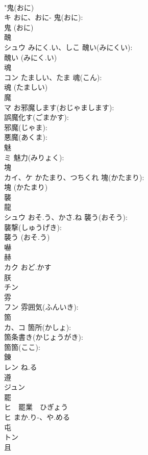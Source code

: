 \documentclass[8pt]{extreport}
\begin{document}
\begin{CJK}{UTF8}{min}
\\	"鬼(おに) 
\\	キ	おに、おに-	鬼(おに): 
\\	鬼 (おに)
\\	醜			
\\	シュウ	みにく.い、しこ	醜い(みにくい): 
\\	醜い (みにく.い)
\\	魂			
\\	コン	たましい、たま	魂(こん): 
\\	魂 (たましい)
\\	魔			
\\	マ		お邪魔します(おじゃまします): 
\\	誤魔化す(ごまかす): 
\\	邪魔(じゃま): 
\\	悪魔(あくま): 
\\	魅			
\\	ミ		魅力(みりょく): 
\\	塊			
\\	カイ、ケ	かたまり、つちくれ	塊(かたまり): 
\\	塊 (かたまり)
\\	襲			
\\	龍 
\\	シュウ	おそ.う、かさ.ね	襲う(おそう): 
\\	襲撃(しゅうげき): 
\\	襲う (おそ.う)
\\	嚇			
\\	赫 
\\	カク	おど.かす		
\\	朕			
\\	チン			
\\	雰			
\\	フン		雰囲気(ふんいき): 
\\	箇			
\\	カ、コ		箇所(かしょ): 
\\	箇条書き(かじょうがき): 
\\	箇箇(ここ): 
\\	錬			
\\	レン	ね.る		
\\	遵			
\\	ジュン			
\\	罷			
\\	ヒ　罷業　ひぎょう
\\	ヒ	まか.り-、や.める		
\\	屯			
\\	トン			
\\	且			

\end{CJK}
\end{document}

